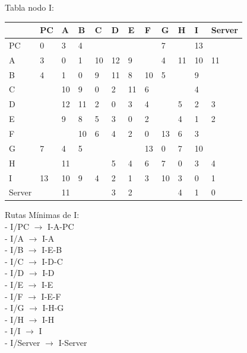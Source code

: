 \documentclass[a4paper]{article}
\begin{document}
\begin{table}[ht]
Tabla nodo I:\\
\begin{tabular}{|l|l|l|l|l|l|l|l|l|l|l|l|}
\hline
       & PC & A  & B & C & D & E & F & G & H & I  & Server \\ \hline
PC     & 0  & 3  & 4 &   &   &   &   & 7 &   & 13 &        \\ \hline
A      & 3  & 0  & 1 & 10& 12& 9 &   & 4 & 11& 10 & 11     \\ \hline
B      & 4  & 1  & 0 & 9 & 11& 8 & 10& 5 &   & 9  &        \\ \hline
C      &    & 10 & 9 & 0 & 2 & 11& 6 &   &   & 4  &        \\ \hline
D      &    & 12 & 11& 2 & 0 & 3 & 4 &   & 5 & 2  & 3      \\ \hline
E      &    & 9  & 8 & 5 & 3 & 0 & 2 &   & 4 & 1  & 2      \\ \hline
F      &    &    & 10& 6 & 4 & 2 & 0 & 13& 6 & 3  &        \\ \hline
G      & 7  & 4  & 5 &   &   &   & 13& 0 & 7 & 10 &        \\ \hline
H      &    & 11 &   &   & 5 & 4 & 6 & 7 & 0 & 3  & 4      \\ \hline
I      & 13 & 10 & 9 & 4 & 2 & 1 & 3 & 10& 3 & 0  & 1      \\ \hline
Server &    & 11 &   &   & 3 & 2 &   &   & 4 & 1  & 0      \\ \hline
\end{tabular}

Rutas Mínimas de I:\\
-	I/PC  $\rightarrow$  I-A-PC\\
-	I/A  $\rightarrow$  I-A\\
-	I/B  $\rightarrow$  I-E-B\\
-	I/C  $\rightarrow$  I-D-C\\
-	I/D  $\rightarrow$  I-D\\
-	I/E  $\rightarrow$  I-E\\
-	I/F  $\rightarrow$  I-E-F\\
-	I/G  $\rightarrow$  I-H-G\\
-	I/H  $\rightarrow$  I-H\\
-	I/I  $\rightarrow$  I\\
-	I/Server  $\rightarrow$  I-Server\\
\end{table}

\clearpage
\end{document}
